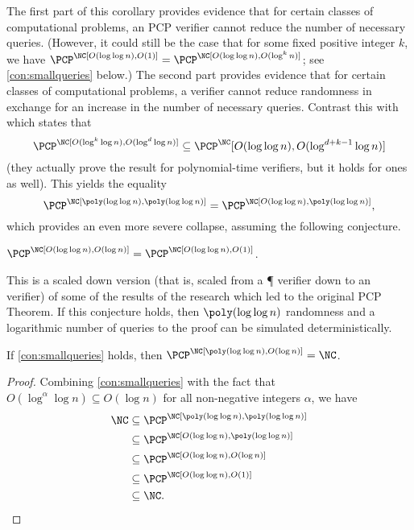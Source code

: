 \documentclass{article}
\newcommand{\loglog}{\log\log}
\begin{document}
The first part of this corollary provides evidence that for certain classes of computational problems, an \NC{} PCP verifier cannot reduce the number of necessary queries.
(However, it could still be the case that for some fixed positive integer $k$, we have $\PCP^\NC[O(\loglog n), O(1)] = \PCP^\NC[O(\loglog n), O(\log^k n)]$; see \autoref{con:smallqueries} below.)
The second part provides evidence that for certain classes of computational problems, a verifier cannot reduce randomness in exchange for an increase in the number of necessary queries.
Contrast this with \autocite[Corollary~10]{fs96} which states that
\begin{equation*}
  \PCP^\NC[O(\log^k \log n), O(\log^d \log n)] \subseteq \PCP^\NC[O(\loglog n), O(\log^{d + k - 1} \log n)]
\end{equation*}
(they actually prove the result for polynomial-time verifiers, but it holds for \NC{} ones as well).
This yields the equality
\begin{equation*}
  \PCP^\NC[\poly(\loglog n), \poly(\loglog n)] = \PCP^\NC[O(\loglog n), \poly(\loglog n)],
\end{equation*}
which provides an even more severe collapse, assuming the following conjecture.
\begin{conjecture}\label{con:smallqueries}
  $\PCP^\NC[O(\loglog n), O(\log n)] = \PCP^\NC[O(\loglog n), O(1)]$.
\end{conjecture}
This is a scaled down version (that is, scaled from a \P{} verifier down to an \NC{} verifier) of some of the results of the research which led to the original PCP Theorem.
If this conjecture holds, then $\poly(\loglog n)$ randomness and a logarithmic number of queries to the proof can be simulated deterministically.
\begin{theorem}
  If \autoref{con:smallqueries} holds, then $\PCP^\NC[\poly(\loglog n), O(\log n)] = \NC$.
\end{theorem}
\begin{proof}
  Combining \autoref{con:smallqueries} with the fact that $O(\log^\alpha \log n) \subseteq O(\log n)$ for all non-negative integers $\alpha$, we have
  \begin{align*}
    \NC & \subseteq \PCP^\NC[\poly(\loglog n), \poly(\loglog n)] \\
    & \subseteq \PCP^\NC[O(\loglog n), \poly(\loglog n)] \\
    & \subseteq \PCP^\NC[O(\loglog n), O(\log n)] \\
    & \subseteq \PCP^\NC[O(\loglog n), O(1)] \\
    & \subseteq \NC.
    \qedhere
  \end{align*}
\end{proof}
\end{document}
